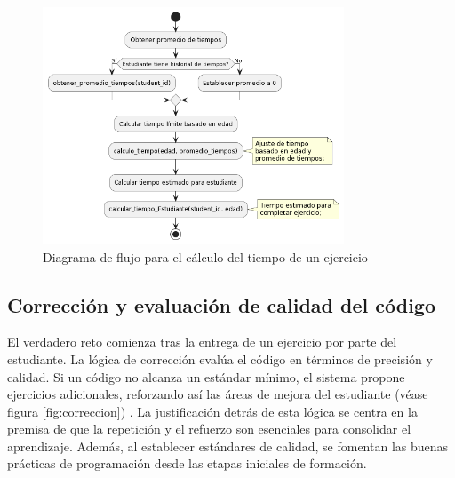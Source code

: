 \begin{figure}[H]
\centering
\includegraphics[width=0.8\textwidth]{imagenes/calculotiempo.png}
\caption{Diagrama de flujo para el cálculo del tiempo de un ejercicio}
\label{fig:calculotiempo}
\end{figure}

\subsection{Corrección y evaluación de calidad del código}

El verdadero reto comienza tras la entrega de un ejercicio por parte del estudiante. La lógica de corrección evalúa el código en términos de precisión y calidad. Si un código no alcanza un estándar mínimo, el sistema propone ejercicios adicionales, reforzando así las áreas de mejora del estudiante (véase figura \ref{fig:correccion}) . La justificación detrás de esta lógica se centra en la premisa de que la repetición y el refuerzo son esenciales para consolidar el aprendizaje. Además, al establecer estándares de calidad, se fomentan las buenas prácticas de programación desde las etapas iniciales de formación.

